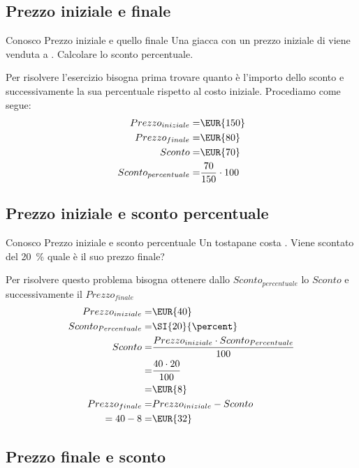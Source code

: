  \subsection{Prezzo iniziale e finale} 
 	\begin{esempiot}{Conosco Prezzo iniziale e quello finale}{}
 	Una giacca con un prezzo iniziale di  viene venduta a . Calcolare lo sconto percentuale. 
 \end{esempiot}
Per risolvere l'esercizio bisogna prima trovare quanto è l'importo dello sconto e successivamente  la sua percentuale rispetto al costo iniziale. Procediamo come segue:
 \begin{align*}
 	{Prezzo}_{iniziale}=&\mbox{\EUR{150}}\\
 	{Prezzo}_{finale}=&\mbox{\EUR{80}}\\
 	Sconto=&\mbox{\EUR{70}}\\
 	{Sconto}_{percentuale}=&\dfrac{70}{150}\cdot 100\\
 \end{align*}
\subsection{Prezzo iniziale e sconto percentuale}
	\begin{esempiot}{Conosco Prezzo iniziale e sconto percentuale}{}
Un tostapane costa . Viene scontato del \SI{20}{\percent} quale è il suo prezzo finale?
\end{esempiot}
Per risolvere questo problema bisogna ottenere dallo ${Sconto}_{percentuale}$  lo $Sconto$ e successivamente il ${Prezzo}_{finale}$
\begin{align*}
	{Prezzo}_{iniziale}=&\mbox{\EUR{40}}\\
 	{Sconto}_{Percentuale}=&\SI{20}{\percent}\\
 	Sconto=&\dfrac{{Prezzo}_{iniziale}\cdot {Sconto}_{Percentuale} }{100}\\
 	=&\dfrac{40\cdot 20 }{100}\\
 	=&\mbox{\EUR{8}}\\
 	{Prezzo}_{finale}=&{Prezzo}_{iniziale}-Sconto\\
 	=40-8=&\mbox{\EUR{32}}\\
\end{align*}
\subsection{Prezzo finale e sconto}